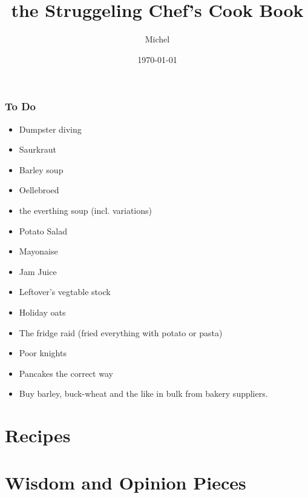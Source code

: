 \documentclass[12pt]{article}
\title{\sc the Struggeling Chef's Cook Book}
\author{Michel}
\date{\today}
\begin{document}
\maketitle

\tableofcontents

\section*{To Do}{
  \begin{itemize}
    \item Dumpster diving
    \item Saurkraut
    \item Barley soup
    \item Oellebroed
    \item the everthing soup (incl. variations)
    \item Potato Salad
    \item Mayonaise
    \item Jam Juice
    \item Leftover's vegtable stock
    \item Holiday oats
    \item The fridge raid (fried everything with potato or pasta)
    \item Poor knights
    \item Pancakes the correct way
    \item Buy barley, buck-wheat and the like in bulk from bakery suppliers.
  \end{itemize}

}

\clearpage
\part{\sc Recipes}\clearpage


\clearpage
{}
\part{\sc Wisdom and Opinion Pieces}
\clearpage

\end{document}
